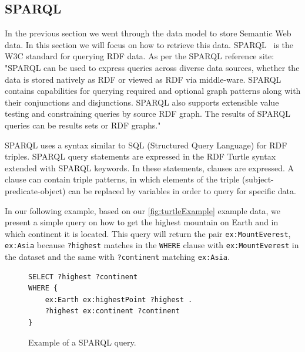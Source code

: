 
\subsection{SPARQL}
\label{chap:SPARQL}

In the previous section we went through the data model to store Semantic Web data. In this section we will focus on how to retrieve this data. SPARQL~\cite{SPARQL} is the W3C standard for querying RDF data. As per the SPARQL reference site: "SPARQL can be used to express queries across diverse data sources, whether the data is stored natively as RDF or viewed as RDF via middle-ware. SPARQL contains capabilities for querying required and optional graph patterns along with their conjunctions and disjunctions. SPARQL also supports extensible value testing and constraining queries by source RDF graph. The results of SPARQL queries can be results sets or RDF graphs."~\cite{SPARQL}

SPARQL uses a syntax similar to SQL (Structured Query Language) for RDF triples. SPARQL query statements are expressed in the RDF Turtle syntax extended with SPARQL keywords. In these statements, clauses are expressed. A clause can contain triple patterns, in which elements of the triple (subject-predicate-object) can be replaced by variables in order to query for specific data.

In our following example, based on our \autoref{fig:turtleExample} example data, we present a simple query on how to get the highest mountain on Earth and in which continent it is located. This query will return the pair \texttt{ex:MountEverest}, \texttt{ex:Asia} because \texttt{?highest} matches in the \texttt{WHERE} clause with \texttt{ex:MountEverest} in the dataset and the same with \texttt{?continent} matching \texttt{ex:Asia}.

\begin{figure}[H]
\begin{verbatim}
SELECT ?highest ?continent
WHERE {
    ex:Earth ex:highestPoint ?highest .
    ?highest ex:continent ?continent
}
\end{verbatim}
\caption{Example of a SPARQL query.}
\label{fig:sparqlQueryExample}
\end{figure}


